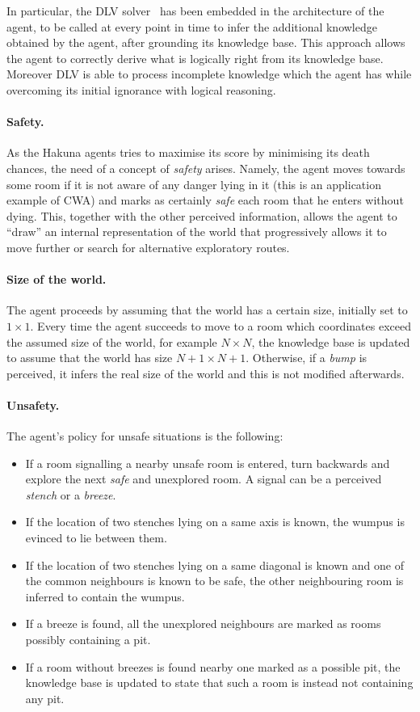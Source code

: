 \documentclass{llncs}
\begin{document}
In particular, the DLV solver~\cite{DLV-system} has been embedded in the architecture of the agent, to be called at every point in time to infer the additional knowledge obtained by the agent, after grounding its knowledge base.
This approach allows the agent to correctly derive what is logically right from its knowledge base. Moreover DLV is able to process incomplete knowledge which the agent has while overcoming its initial ignorance with logical reasoning.

\paragraph{Safety.} As the Hakuna agents tries to maximise its score by minimising its death chances, the need of a concept of \emph{safety} arises.
Namely, the agent moves towards some room if it is not aware of any danger lying in it (this is an application example of CWA) and marks as certainly \emph{safe} each room that he enters without dying.
This, together with the other perceived information, allows the agent to ``draw'' an internal representation of the world that progressively allows it to move further or search for alternative exploratory routes.

\paragraph{Size of the world.} The agent proceeds by assuming that the world has a certain size, initially set to $1 \times 1$.
Every time the agent succeeds to move to a room which coordinates exceed the assumed size of the world, for example $N \times N$, the knowledge base is updated to assume that the world has size $N+1 \times N+1$.
Otherwise, if a \emph{bump} is perceived, it infers the real size of the world and this is not modified afterwards.

\paragraph{Unsafety.} The agent's policy for unsafe situations is the following:
\begin{itemize}
	\item If a room signalling a nearby unsafe room is entered, turn backwards and explore the next \emph{safe} and unexplored room. A signal can be a perceived \emph{stench} or a \emph{breeze}.
	\item If the location of two stenches lying on a same axis is known, the wumpus is evinced to lie between them.
	\item If the location of two stenches lying on a same diagonal is known and one of the common neighbours is known to be safe, the other neighbouring room is inferred to contain the wumpus.
	\item If a breeze is found, all the unexplored neighbours are marked as rooms possibly containing a pit.
	\item If a room without breezes is found nearby one marked as a possible pit, the knowledge base is updated to state that such a room is instead not containing any pit.
\end{itemize}
\end{document}
